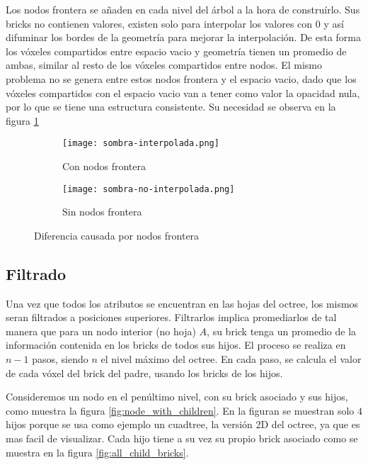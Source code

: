 Los nodos frontera se añaden en cada nivel del árbol a la hora de construírlo.
Sus bricks no contienen valores, existen solo para interpolar los valores con 0 y así difuminar los bordes de la geometría para mejorar la interpolación.
De esta forma los vóxeles compartidos entre espacio vacio y geometría tienen un promedio de ambas, similar al resto de los vóxeles compartidos entre nodos.
El mismo problema no se genera entre estos nodos frontera y el espacio vacio, dado que los vóxeles compartidos con el espacio vacio van a tener como valor la opacidad nula, por lo que se tiene una estructura consistente.
Su necesidad se observa en la figura \ref{fig:nodos_frontera}

\begin{figure}
    \begin{subfigure}{.5\textwidth}
        \centering
        \texttt{[image: sombra-interpolada.png]}
        \caption{Con nodos frontera}
    \end{subfigure}
    \begin{subfigure}{.5\textwidth}
        \centering
        \texttt{[image: sombra-no-interpolada.png]}
        \caption{Sin nodos frontera}
    \end{subfigure}
    \caption{Diferencia causada por nodos frontera}
    \label{fig:nodos_frontera}
\end{figure}

\subsection{Filtrado}\label{design:filtering}

Una vez que todos los atributos se encuentran en las hojas del octree, los mismos seran filtrados a posiciones superiores.
Filtrarlos implica promediarlos de tal manera que para un nodo interior (no hoja) $A$, su brick tenga un promedio de la información contenida en los bricks de todos sus hijos.
El proceso se realiza en $n - 1$ pasos, siendo $n$ el nivel máximo del octree.
En cada paso, se calcula el valor de cada vóxel del brick del padre, usando los bricks de los hijos.

Consideremos un nodo en el penúltimo nivel, con su brick asociado y sus hijos, como muestra la figura \ref{fig:node_with_children}.
En la figuran se muestran solo $4$ hijos porque se usa como ejemplo un cuadtree, la versión 2D del octree, ya que es mas facil de visualizar.
Cada hijo tiene a su vez su propio brick asociado como se muestra en la figura \ref{fig:all_child_bricks}.

